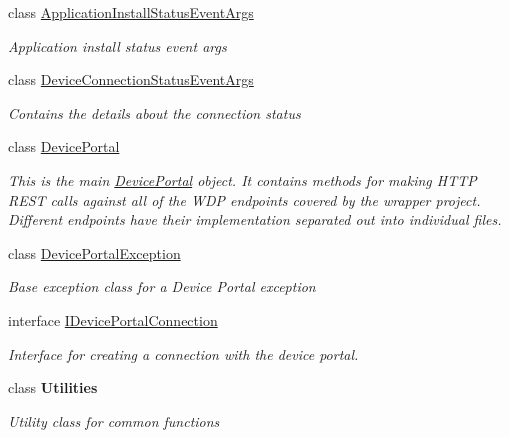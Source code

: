\begin{DoxyCompactItemize}
\item 
class \hyperlink{class_microsoft_1_1_tools_1_1_windows_device_portal_1_1_application_install_status_event_args}{Application\+Install\+Status\+Event\+Args}
\begin{DoxyCompactList}\small\item\em Application install status event args \end{DoxyCompactList}\item 
class \hyperlink{class_microsoft_1_1_tools_1_1_windows_device_portal_1_1_device_connection_status_event_args}{Device\+Connection\+Status\+Event\+Args}
\begin{DoxyCompactList}\small\item\em Contains the details about the connection status \end{DoxyCompactList}\item 
class \hyperlink{class_microsoft_1_1_tools_1_1_windows_device_portal_1_1_device_portal}{Device\+Portal}
\begin{DoxyCompactList}\small\item\em This is the main \hyperlink{class_microsoft_1_1_tools_1_1_windows_device_portal_1_1_device_portal}{Device\+Portal} object. It contains methods for making H\+T\+TP R\+E\+ST calls against all of the W\+DP endpoints covered by the wrapper project. Different endpoints have their implementation separated out into individual files. \end{DoxyCompactList}\item 
class \hyperlink{class_microsoft_1_1_tools_1_1_windows_device_portal_1_1_device_portal_exception}{Device\+Portal\+Exception}
\begin{DoxyCompactList}\small\item\em Base exception class for a Device Portal exception \end{DoxyCompactList}\item 
interface \hyperlink{interface_microsoft_1_1_tools_1_1_windows_device_portal_1_1_i_device_portal_connection}{I\+Device\+Portal\+Connection}
\begin{DoxyCompactList}\small\item\em Interface for creating a connection with the device portal. \end{DoxyCompactList}\item 
class {\bfseries Utilities}
\begin{DoxyCompactList}\small\item\em Utility class for common functions \end{DoxyCompactList}\item 

\end{DoxyCompactItemize}

